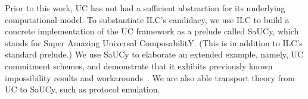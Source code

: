 Prior to this work, UC has not had a sufficient abstraction for its underlying
computational model. To substantiate ILC's candidacy, we use ILC to build a
concrete implementation of the UC framework as a prelude called SaUCy, which
stands for Super Amazing Universal ComposabilitY. (This is in addition to ILC's
standard prelude.) We use SaUCy to elaborate an extended example, namely, UC
commitment schemes, and demonstrate that it exhibits previously known
impossibility results and workarounds~\cite{canetti2001commitments}. We are also
able transport theory from UC to SaUCy, such as protocol emulation. 




